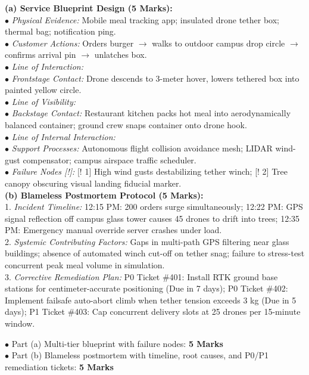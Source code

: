 \begin{solutionbox}
\textbf{(a) Service Blueprint Design (5 Marks):}\\
$\bullet$ \textit{Physical Evidence:} Mobile meal tracking app; insulated drone tether box; thermal bag; notification ping.\\
$\bullet$ \textit{Customer Actions:} Orders burger $\to$ walks to outdoor campus drop circle $\to$ confirms arrival pin $\to$ unlatches box.\\
$\bullet$ \textit{Line of Interaction:}\\
$\bullet$ \textit{Frontstage Contact:} Drone descends to 3-meter hover, lowers tethered box into painted yellow circle.\\
$\bullet$ \textit{Line of Visibility:}\\
$\bullet$ \textit{Backstage Contact:} Restaurant kitchen packs hot meal into aerodynamically balanced container; ground crew snaps container onto drone hook.\\
$\bullet$ \textit{Line of Internal Interaction:}\\
$\bullet$ \textit{Support Processes:} Autonomous flight collision avoidance mesh; LIDAR wind-gust compensator; campus airspace traffic scheduler.\\
$\bullet$ \textit{Failure Nodes [!]:} [! 1] High wind gusts destabilizing tether winch; [! 2] Tree canopy obscuring visual landing fiducial marker.\\
\textbf{(b) Blameless Postmortem Protocol (5 Marks):}\\
1. \textit{Incident Timeline:} 12:15 PM: 200 orders surge simultaneously; 12:22 PM: GPS signal reflection off campus glass tower causes 45 drones to drift into trees; 12:35 PM: Emergency manual override server crashes under load.\\
2. \textit{Systemic Contributing Factors:} Gaps in multi-path GPS filtering near glass buildings; absence of automated winch cut-off on tether snag; failure to stress-test concurrent peak meal volume in simulation.\\
3. \textit{Corrective Remediation Plan:} P0 Ticket \#401: Install RTK ground base stations for centimeter-accurate positioning (Due in 7 days); P0 Ticket \#402: Implement failsafe auto-abort climb when tether tension exceeds 3 kg (Due in 5 days); P1 Ticket \#403: Cap concurrent delivery slots at 25 drones per 15-minute window.
\begin{markingrubric}
$\bullet$ Part (a) Multi-tier blueprint with failure nodes: \textbf{5 Marks}\\
$\bullet$ Part (b) Blameless postmortem with timeline, root causes, and P0/P1 remediation tickets: \textbf{5 Marks}
\end{markingrubric}
\end{solutionbox}
